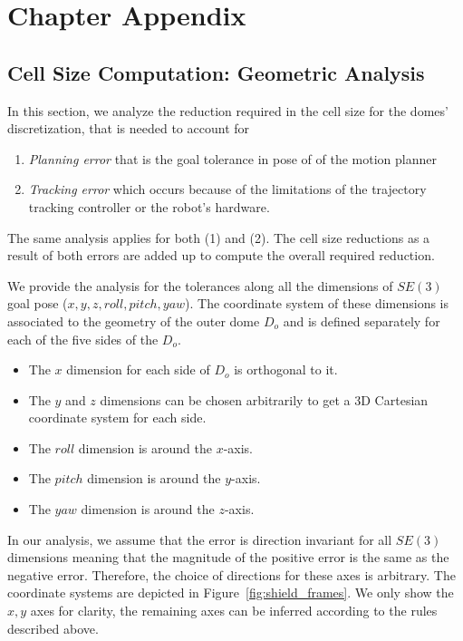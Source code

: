 \documentclass[a4paper]{report}
\begin{document}
\section{Chapter Appendix}
\subsection{Cell Size Computation: Geometric Analysis}
\label{sec:cell_size}
In this section, we analyze the reduction required in the cell size for the domes’ discretization, that is needed to account for

\begin{enumerate}
	\item \emph{Planning error} that is the goal tolerance in pose of \calS of the motion planner
	\item \emph{Tracking error} which occurs because of the limitations of the trajectory tracking controller or the robot's hardware.
\end{enumerate}

The same analysis applies for both (1) and (2). The cell size reductions as a result of both errors are added up to compute the overall required reduction.

We provide the analysis for the tolerances along all the dimensions of $SE(3)$ goal pose ($x,y,z,roll,pitch,yaw$). The coordinate system of these dimensions is associated to the geometry of the outer dome $D_o$ and is defined separately for each of the five sides of the $D_o$.

\begin{itemize}
	\item The $x$ dimension for each side of $D_o$ is orthogonal to it.
	\item The $y$ and $z$ dimensions can be chosen arbitrarily to get a 3D Cartesian coordinate system for each side.
	\item The $roll$ dimension is around the $x$-axis.
	\item The $pitch$ dimension is around the $y$-axis.
	\item The $yaw$ dimension is around the $z$-axis.
\end{itemize}

In our analysis, we assume that the error is direction invariant for all $SE(3)$ dimensions meaning that the magnitude of the positive error is the same as the negative error. Therefore, the choice of directions for these axes is arbitrary. The coordinate systems are depicted in Figure~\ref{fig:shield_frames}. We only show the $x,y$ axes for clarity, the remaining axes can be inferred according to the rules described above.
\end{document}
